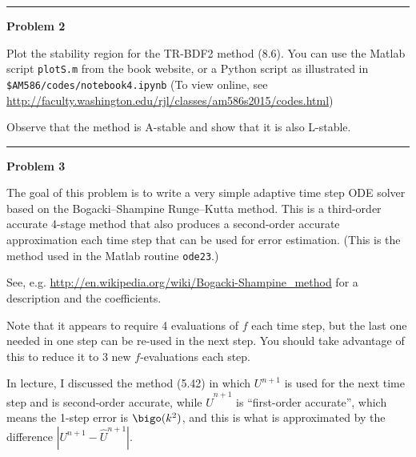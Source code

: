 \documentclass[10pt]{article}
\begin{document}


\newpage
\vskip 1cm
\hrule
{\bf Problem 2}  

Plot the stability region for the TR-BDF2
method (8.6).   You can use the Matlab script \texttt{plotS.m}
from the book website, or a Python script as illustrated in 
{\tt \$AM586/codes/notebook4.ipynb}
(To view online, see 
\url{http://faculty.washington.edu/rjl/classes/am586s2015/codes.html})

Observe that the method is A-stable and show that it is
also L-stable.




\vskip 1cm
\hrule
{\bf Problem 3}  

The goal of this problem is to write a very simple adaptive time step ODE
solver based on the Bogacki--Shampine Runge--Kutta method.  This is a
third-order accurate 4-stage method that also produces a second-order
accurate approximation each time step that can be used for error estimation. 
(This is the method used in the Matlab routine \texttt{ode23}.)

See, e.g. \url{http://en.wikipedia.org/wiki/Bogacki-Shampine\_method}
for a description and the coefficients. 

Note that it appears to require 4 evaluations of $f$ each time step, but the
last one needed in one step can be re-used in the next step.  You should
take advantage of this to reduce it to 3 new $f$-evaluations each step.

In lecture, I discussed the method (5.42) in which $U^{n+1}$ is used for the
next time step and is second-order accurate, while $\hat U^{n+1}$ is 
``first-order accurate'', which means the 1-step error is $\bigo(k^2)$, and
this is what is approximated by the difference $|U^{n+1}-\hat U^{n+1}|$.
\end{document}
